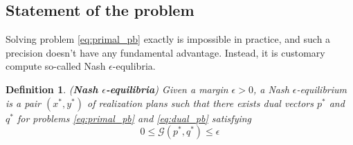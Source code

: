\documentclass[12pt]{article}
\newtheorem{definition}[theorem]{Definition}
\begin{document}


\subsection{Statement of the problem}
Solving problem \eqref{eq:primal_pb} exactly is impossible in practice, and such a precision doesn't have any fundamental advantage. Instead, it is customary compute so-called Nash $\epsilon$-equlibria.

\begin{definition}(\textbf{Nash $\epsilon$-equilibria})
Given a margin $\epsilon > 0$, a Nash $\epsilon$-equilibrium is a pair $(x^*, y^*)$ of realization plans such that there exists dual vectors $p^*$ and $q^*$ for problems \eqref{eq:primal_pb} and \eqref{eq:dual_pb} satisfying
\begin{equation}
  0 \le \mathcal{G}(p^*, q^*) \le \epsilon
\label{eq:approx_pb}
\end{equation}
\end{definition}
\end{document}

